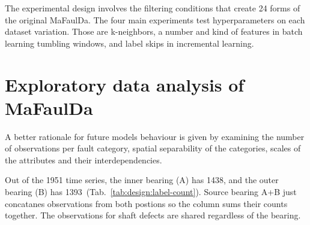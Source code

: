 The experimental design involves the filtering conditions that create 24 forms of the original MaFaulDa. The four main experiments test hyperparameters on each dataset variation. Those are k-neighbors, a number and kind of features in batch learning tumbling windows, and label skips in incremental learning.

\section{Exploratory data analysis of MaFaulDa}
A better rationale for future models behaviour is given by examining the number of observations per fault category, spatial separability of the categories, scales of the attributes and their interdependencies.

Out of the 1951 time series, the inner bearing (A) has 1438, and the outer bearing (B) has 1393~(Tab.~\ref{tab:design:label-count}). Source bearing A+B just concatanes observations from both postions so the column sums their counts together. The observations for shaft defects are shared regardless of the bearing. 
